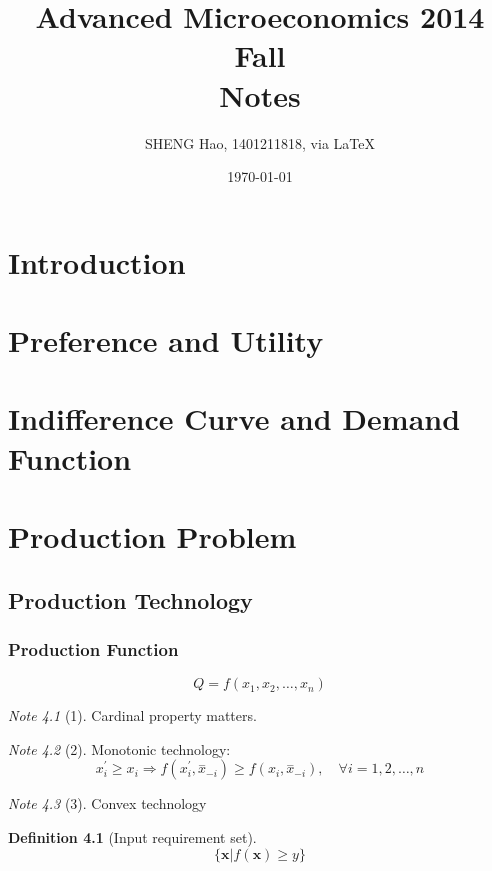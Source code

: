 \documentclass{book}
\theoremstyle{plain}
\theoremstyle{definition}
\newtheorem{defn}{Definition}[section]
\theoremstyle{remark}
\newtheorem*{note}{Note}
\begin{document}
\title{Advanced Microeconomics 2014 Fall\\Notes}
\author{{\normalsize SHENG Hao, 1401211818, via \LaTeX}}
\date{\today}

\maketitle
\def \Pr{{\rm Pr}}
\baselineskip 0.6cm
\tableofcontents
\chapter{Introduction}
\chapter{Preference and Utility}
\chapter{Indifference Curve and Demand Function}

\chapter{Production Problem}
\section{Production Technology}
\subsection{Production Function}
\begin{equation}
	Q = f(x_1,x_2,\dots,x_n)
\end{equation}
\begin{note}[1]
Cardinal property matters.
\end{note}
\begin{note}[2]
Monotonic technology:
\begin{equation}
	x^{'}_i\geq x_i \Rightarrow f(x^{'}_i, \overset{-}x_{-i})\geq f(x_i, \overset{-}x_{-i}), \quad \forall i = 1, 2, \dots, n
\end{equation}
\end{note}
\begin{note}[3]
Convex technology 
\end{note}

\begin{defn}[Input requirement set]
\begin{equation}
	\{ \bm{x}|f(\bm{x}) \geq y \}
\end{equation}
\end{defn}
\end{document}
